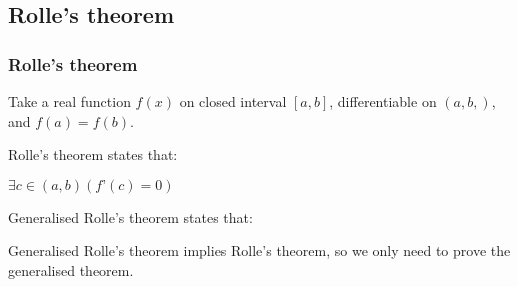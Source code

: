 
\subsection{Rolle's theorem}

\subsubsection{Rolle’s theorem}

Take a real function \(f(x)\) on closed interval \([a,b]\), differentiable on \((a,b,)\), and \(f(a)=f(b)\).

Rolle’s theorem states that:

\(\exists c\in(a,b) (f’(c)=0)\)

Generalised Rolle’s theorem states that:

Generalised Rolle’s theorem implies Rolle’s theorem, so we only need to prove the generalised theorem.


